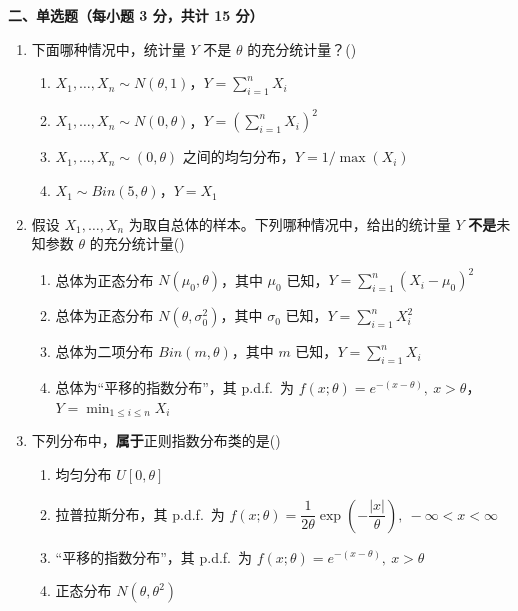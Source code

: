 \documentclass[12pt,a4paper]{ctexart}
\newcommand{\question}[2]{\bigskip\noindent\textbf{#1}\par\nobreak\medskip}
\begin{document}
\question{二、单选题（每小题 3 分，共计 15 分）}{15}
\begin{enumerate}[label=\arabic*.,leftmargin=2.2em]
  \item 下面哪种情况中，统计量 $Y$ 不是 $\theta$ 的充分统计量？\hfill(\underline{\hspace{1.2cm}})
  \begin{enumerate}[label=\Alph*.,leftmargin=2.0em]
    \item $X_{1},\ldots,X_{n}\sim N(\theta,1)$，$Y=\sum_{i=1}^{n}X_{i}$
    \item $X_{1},\ldots,X_{n}\sim N(0,\theta)$，$Y=\left(\sum_{i=1}^{n}X_{i}\right)^{2}$
    \item $X_{1},\ldots,X_{n}\sim(0,\theta)$ 之间的均匀分布，$Y=1/\max(X_{i})$
    \item $X_{1}\sim Bin(5,\theta)$，$Y=X_{1}$
  \end{enumerate}

  \item 假设 $X_{1},\ldots,X_{n}$ 为取自总体的样本。下列哪种情况中，给出的统计量 $Y$ \textbf{不是}未知参数 $\theta$ 的充分统计量\hfill(\underline{\hspace{1.2cm}})
  \begin{enumerate}[label=\Alph*.,leftmargin=2.0em]
    \item 总体为正态分布 $N(\mu_{0},\theta)$，其中 $\mu_{0}$ 已知，$Y=\sum_{i=1}^{n}\left(X_{i}-\mu_{0}\right)^{2}$
    \item 总体为正态分布 $N(\theta,\sigma_{0}^{2})$，其中 $\sigma_{0}$ 已知，$Y=\sum_{i=1}^{n}X_{i}^{2}$
    \item 总体为二项分布 $Bin(m,\theta)$，其中 $m$ 已知，$Y=\sum_{i=1}^{n}X_{i}$
    \item 总体为“平移的指数分布”，其 p.d.f.\ 为 $f(x;\theta)=e^{-(x-\theta)},\ x>\theta$，$Y=\min_{1\le i\le n}X_{i}$
  \end{enumerate}

  \item 下列分布中，\textbf{属于}正则指数分布类的是\hfill(\underline{\hspace{1.2cm}})
  \begin{enumerate}[label=\Alph*.,leftmargin=2.0em]
    \item 均匀分布 $U[0,\theta]$
    \item 拉普拉斯分布，其 p.d.f.\ 为 $f(x;\theta)=\dfrac{1}{2\theta}\exp\!\left(-\dfrac{|x|}{\theta}\right),\ -\infty<x<\infty$
    \item “平移的指数分布”，其 p.d.f.\ 为 $f(x;\theta)=e^{-(x-\theta)},\ x>\theta$
    \item 正态分布 $N(\theta,\theta^{2})$
  \end{enumerate}


\end{enumerate}
\end{document}
